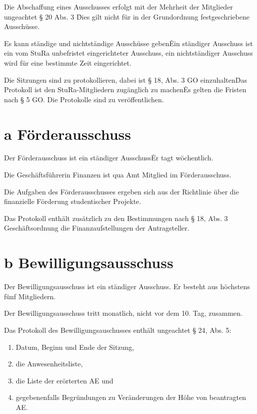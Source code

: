 \begin{multicols}{2}
\Abs \Satz Die Abschaffung eines Ausschusses erfolgt mit der Mehrheit der Mitglieder ungeachtet § 20 Abs. 3 \. Dies gilt nicht für in der Grundordnung festgeschriebene Ausschüsse.

\Abs \Satz Es kann ständige und nichtständige Ausschüsse geben\. Ein ständiger Ausschuss ist ein vom StuRa unbefristet eingerichteter Ausschuss, ein nichtständiger Ausschuss wird für eine bestimmte Zeit eingerichtet.

\Abs \Satz Die Sitzungen sind zu protokollieren, dabei ist § 18, Abs. 3 GO einzuhalten\. Das Protokoll ist den StuRa-Mitgliedern zugänglich zu machen\. Es gelten die Fristen nach § 5 GO. Die Protokolle sind zu veröffentlichen.



\setcounter{section}{23}
\section{a Förderausschuss}

\Abs \Satz Der Förderausschuss ist ein ständiger Ausschuss\. Er tagt wöchentlich.

\Abs \Satz Die Geschäftsführerin Finanzen ist qua Amt Mitglied im Förderausschuss.

\Abs \Satz Die Aufgaben des Förderausschusses ergeben sich aus der Richtlinie über die finanzielle Förderung studentischer Projekte.

\Abs \Satz Das Protokoll enthält zusätzlich zu den Bestimmungen nach § 18, Abs. 3 Geschäftsordnung die Finanzaufstellungen der Antragsteller.



\setcounter{section}{23}
\section{b Bewilligungsausschuss}

\Abs \Satz Der Bewilligungsausschuss ist ein ständiger Ausschuss. Er besteht aus höchstens fünf Mitgliedern.

\Abs \Satz Der Bewilligungsausschuss tritt monatlich, nicht vor dem 10. Tag, zusammen.

\Abs \Satz Das Protokoll des Bewilligungsauschusses enthält ungeachtet § 24, Abs. 5:
\begin{enumerate}
\item Datum, Beginn und Ende der Sitzung,
\item die Anwesenheitsliste,
\item die Liste der erörterten AE und
\item gegebenenfalls Begründungen zu Veränderungen der Höhe von beantragten AE.
\end{enumerate}


\end{multicols}

